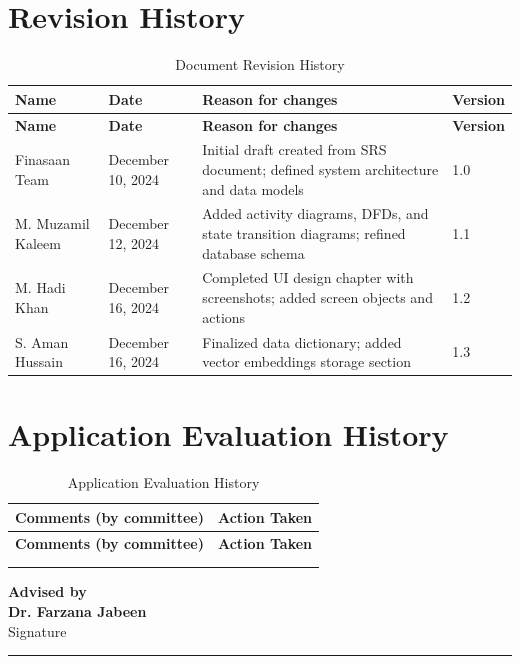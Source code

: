 \documentclass[12pt,a4paper]{report}
\begin{document}
\chapter*{Revision History}

\begin{longtable}{|p{3cm}|p{3cm}|p{5cm}|p{2cm}|}
\caption{Document Revision History} \label{tab:revision-history} \\
\hline
\textbf{Name} & \textbf{Date} & \textbf{Reason for changes} & \textbf{Version} \\
\hline
\endfirsthead
\hline
\textbf{Name} & \textbf{Date} & \textbf{Reason for changes} & \textbf{Version} \\
\hline
\endhead
Finasaan Team & December 10, 2024 & Initial draft created from SRS document; defined system architecture and data models & 1.0 \\
\hline
M. Muzamil Kaleem & December 12, 2024 & Added activity diagrams, DFDs, and state transition diagrams; refined database schema & 1.1 \\
\hline
M. Hadi Khan & December 16, 2024 & Completed UI design chapter with screenshots; added screen objects and actions & 1.2 \\
\hline
S. Aman Hussain & December 16, 2024 & Finalized data dictionary; added vector embeddings storage section & 1.3 \\
\hline
\end{longtable}

\chapter*{Application Evaluation History}

\begin{longtable}{|p{7cm}|p{7cm}|}
\caption{Application Evaluation History} \label{tab:evaluation-history} \\
\hline
\textbf{Comments (by committee)} & \textbf{Action Taken} \\
\hline
\endfirsthead
\hline
\textbf{Comments (by committee)} & \textbf{Action Taken} \\
\hline
\endhead
 & \\
\hline
 & \\
\hline
\end{longtable}

\vspace{1cm}
\noindent\textbf{Advised by}\\
\textbf{Dr. Farzana Jabeen}\\
Signature\hspace{2cm}\rule{5cm}{0.4pt}
\end{document}

